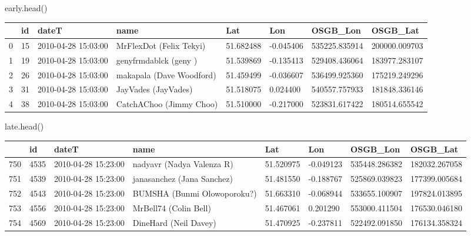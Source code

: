 \documentclass[
  letterpaper,
  DIV=11,
  numbers=noendperiod]{scrreprt}
\newenvironment{Shaded}{\begin{snugshade}}{\end{snugshade}}
\newcommand{\NormalTok}[1]{\textcolor[rgb]{0.00,0.23,0.31}{#1}}
\begin{document}
\begin{Shaded}
\begin{Highlighting}[]
\NormalTok{early.head()}
\end{Highlighting}
\end{Shaded}

\begin{longtable}[]{@{}llllllll@{}}
\toprule()
& id & dateT & name & Lat & Lon & OSGB\_Lon & OSGB\_Lat \\
\midrule()
\endhead
0 & 15 & 2010-04-28 15:03:00 & MrFlexDot (Felix Tekyi) & 51.682488 &
-0.045406 & 535225.835914 & 200000.009703 \\
1 & 19 & 2010-04-28 15:03:00 & genyfrmdablck (geny ) & 51.539869 &
-0.135413 & 529408.436064 & 183977.283107 \\
2 & 26 & 2010-04-28 15:03:00 & makapala (Dave Woodford) & 51.459499 &
-0.036607 & 536499.925360 & 175219.249296 \\
3 & 31 & 2010-04-28 15:03:00 & JayVades (JayVades) & 51.518075 &
0.024400 & 540557.757933 & 181848.336146 \\
4 & 38 & 2010-04-28 15:03:00 & CatchAChoo (Jimmy Choo) & 51.510000 &
-0.217000 & 523831.617422 & 180514.655542 \\
\bottomrule()
\end{longtable}

\begin{Shaded}
\begin{Highlighting}[]
\NormalTok{late.head()}
\end{Highlighting}
\end{Shaded}

\begin{longtable}[]{@{}llllllll@{}}
\toprule()
& id & dateT & name & Lat & Lon & OSGB\_Lon & OSGB\_Lat \\
\midrule()
\endhead
750 & 4535 & 2010-04-28 15:23:00 & nadyavr (Nadya Valenza R) & 51.520975
& -0.049123 & 535448.286382 & 182032.267058 \\
751 & 4539 & 2010-04-28 15:23:00 & janasanchez (Jana Sanchez) &
51.481550 & -0.188767 & 525869.039823 & 177399.005684 \\
752 & 4543 & 2010-04-28 15:23:00 & BUMSHA (Bunmi Olowoporoku?) &
51.663310 & -0.068944 & 533655.100907 & 197824.013895 \\
753 & 4556 & 2010-04-28 15:23:00 & MrBell74 (Colin Bell) & 51.467061 &
0.201290 & 553000.411504 & 176530.046180 \\
754 & 4569 & 2010-04-28 15:23:00 & DineHard (Neil Davey) & 51.470925 &
-0.237811 & 522492.091850 & 176134.358324 \\
\bottomrule()
\end{longtable}
\end{document}
